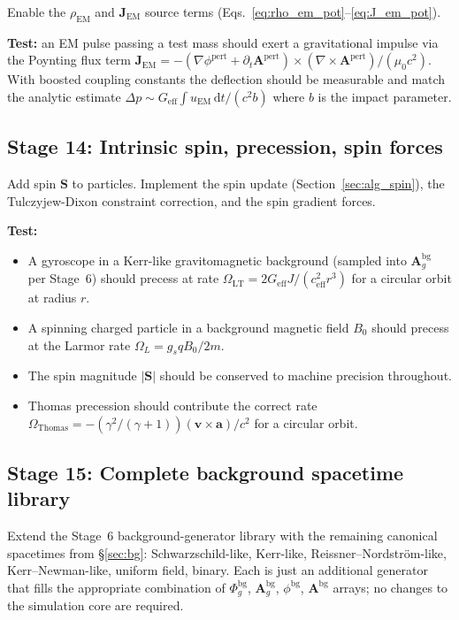 \documentclass[11pt,a4paper]{article}
\newcommand{\vv}[1]{\mathbf{#1}}
\newcommand{\Phig}{\Phi_g}
\newcommand{\Ag}{\vv{A}_g}
\newcommand{\dd}{\mathrm{d}}
\begin{document}
Enable the $\rho_{\mathrm{EM}}$ and $\vv{J}_{\mathrm{EM}}$ source terms (Eqs.~\ref{eq:rho_em_pot}--\ref{eq:J_em_pot}).

\textbf{Test:} an EM pulse passing a test mass should exert a gravitational impulse via the Poynting flux term $\vv{J}_{\mathrm{EM}} = -(\nabla\phi^{\mathrm{pert}}+\partial_t\vv{A}^{\mathrm{pert}})\times(\nabla\times\vv{A}^{\mathrm{pert}})/(\mu_0 c^2)$.  With boosted coupling constants the deflection should be measurable and match the analytic estimate $\Delta p \sim G_{\mathrm{eff}}\int u_{\mathrm{EM}}\,\dd t / (c^2 b)$ where $b$ is the impact parameter.

\subsection{Stage 14: Intrinsic spin, precession, spin forces}

Add spin $\vv{S}$ to particles.  Implement the spin update (Section~\ref{sec:alg_spin}), the Tulczyjew-Dixon constraint correction, and the spin gradient forces.

\textbf{Test:}
\begin{itemize}
  \item A gyroscope in a Kerr-like gravitomagnetic background (sampled into $\Ag^{\mathrm{bg}}$ per Stage~6) should precess at rate $\Omega_{\mathrm{LT}} = 2G_{\mathrm{eff}}J/(c_{\mathrm{eff}}^2 r^3)$ for a circular orbit at radius $r$.
  \item A spinning charged particle in a background magnetic field $B_0$ should precess at the Larmor rate $\Omega_L = g_s qB_0/2m$.
  \item The spin magnitude $|\vv{S}|$ should be conserved to machine precision throughout.
  \item Thomas precession should contribute the correct rate $\Omega_{\mathrm{Thomas}} = -(\gamma^2/(\gamma+1))(\vv{v}\times\vv{a})/c^2$ for a circular orbit.
\end{itemize}

\subsection{Stage 15: Complete background spacetime library}

Extend the Stage~6 background-generator library with the remaining canonical spacetimes from §\ref{sec:bg}: Schwarzschild-like, Kerr-like, Reissner--Nordstr\"om-like, Kerr--Newman-like, uniform field, binary.  Each is just an additional generator that fills the appropriate combination of $\Phig^{\mathrm{bg}}$, $\Ag^{\mathrm{bg}}$, $\phi^{\mathrm{bg}}$, $\vv{A}^{\mathrm{bg}}$ arrays; no changes to the simulation core are required.
\end{document}
